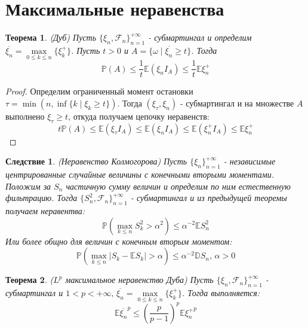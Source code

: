 \documentclass[12pt,a4paper]{article} %
\newtheorem{theorem}{Теорема}
\newtheorem{consequence}{Следствие}
\newcommand{\E}{\mathbb{E}}
\newcommand{\D}{\mathbb{D}}
\newcommand{\PR}{\mathbb{P}}
\newcommand{\F}{\mathcal{F}}
\begin{document}
	\section{Максимальные неравенства}
	\begin{theorem}
		(Дуб) Пусть $\{\xi_n,\F_n\}_{n=1}^{+\infty}$ - субмартингал и определим $\overline{\xi_n}=\max\limits_{0\leq k\leq n}\{\xi_k^{+}\}$. Пусть $t>0$ и $A=\{\omega\mid\overline{\xi_n}\geq t\}$. Тогда
		$$\PR(A)\leq \frac{1}{t}\E(\xi_nI_A)\leq\frac{1}{t}\E\xi_n^{+}$$
	\end{theorem}
	\begin{proof}
		Определим ограниченный момент остановки $\tau=\min(n,\inf\{k\mid\xi_k\geq t\})$. Тогда $(\xi_{\tau},\xi_n)$ - субмартингал и на множестве $A$ выполнено $\xi_{\tau}\geq t$, откуда получаем цепочку неравенств:
		$$t\PR(A)\leq\E(\xi_{\tau}I_A)\leq\E(\xi_nI_A)\leq\E(\xi_n^{+}I_A)\leq\E\xi_n^{+}$$
	\end{proof}
	\begin{consequence}
		(Неравенство Колмогорова) Пусть $\{\xi_n\}_{n=1}^{+\infty}$ - независимые центрированные случайные величины с конечными вторыми моментами. Положим за $S_n$ частичную сумму величин и определим по ним естественную фильтрацию. Тогда $\{S_n^2,\F_n\}_{n=1}^{+\infty}$ - субмартингал и из предыдущей теоремы получаем неравентва:
		$$\PR(\max\limits_{k\leq n}S_k^2>\alpha^2)\leq\alpha^{-2}\E S_n^2$$
		Или более общно для величин с конечным вторым моментом:
		$$\PR(\max\limits_{k\leq n}|S_k-\E S_k|>\alpha)\leq\alpha^{-2}\D S_n,\,\alpha>0$$
	\end{consequence}
	\begin{theorem}
		($L^p$ максимальное неравенство Дуба) Пусть $\{\xi_n,\F_n\}_{n=1}^{+\infty}$ - субмартингал и $1<p<+\infty,\,\overline{\xi_n}=\max\limits_{0\leq k\leq n}\{\xi_k^{+}\}$. Тогда выполняется:
		$$\E\overline{\xi_n}^p\leq\left(\frac{p}{p-1}\right)^p\E{\xi_n^{+}}^p$$
	\end{theorem}
\end{document}
